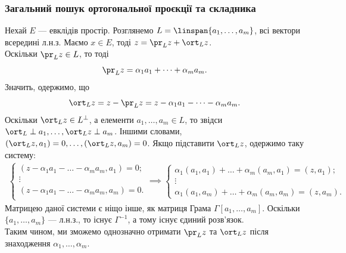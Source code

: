 \documentclass{math_library}
\begin{document}
\subsubsection*{Загальний пошук ортогональної проєкції та складника}
Нехай $E$ --- евклідів простір. Розглянемо $L = \linspan\{a_1,\dots,a_m\}$, всі вектори всередині л.н.з. Маємо $x \in E$, тоді $z = \pr_L z + \ort_L z$.\\
Оскільки $\pr_L z \in L$, то тоді 
\[
\pr_L z = \alpha_1 a_1 + \dots + \alpha_m a_m.
\]
Значить, одержимо, що
\[
\ort_L z = z - \pr_L z = \displaystyle z - \alpha_1 a_1 - \dots - \alpha_m a_m.
\]
Оскільки $\ort_L z \in L^\perp$, а елементи $a_1,\dots,a_m \in L$, то звідси $\ort_L \perp a_1, \dots, \ort_L z \perp a_m$. Іншими словами, $(\ort_L z,a_1) = 0, \dots, (\ort_L z,a_m) = 0$. Якщо підставити $\ort_L z$, одержимо таку систему:
\begin{align*}
\begin{cases}
(\displaystyle z - \alpha_1 a_1 - \dots - \alpha_m a_m, a_1) = 0; \\
\vdots \\
(\displaystyle z - \alpha_1 a_1 - \dots - \alpha_m a_m,a_m) = 0. \\
\end{cases} \implies
\begin{cases}
\alpha_1 (a_1,a_1) + \dots + \alpha_m (a_m,a_1) = (z,a_1); \\
\vdots \\
\alpha_1 (a_1,a_m) + \dots + \alpha_m (a_m,a_m) = (z,a_m).
\end{cases}
\end{align*}
Матрицею даної системи є ніщо інше, як матриця Грама $\Gamma[a_1,\dots,a_m]$. Оскільки $\{a_1,\dots,a_m\}$ --- л.н.з., то існує $\Gamma^{-1}$, а тому існує єдиний розв'язок.\\
Таким чином, ми зможемо однозначно отримати $\pr_L z$ та $\ort_L z$ після знаходження $\alpha_1,\dots,\alpha_m$.
\end{document}
